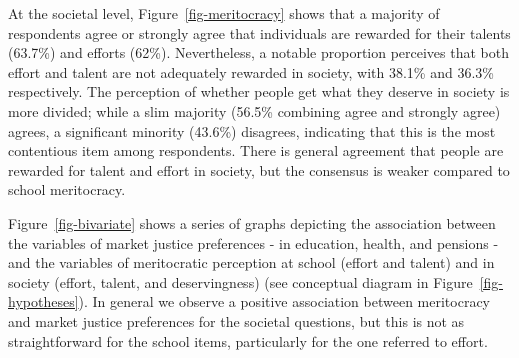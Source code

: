 \documentclass[
    behavsci,
    article,
    submit,
moreauthors
]{mdpi}
\begin{document}
At the societal level, Figure~\ref{fig-meritocracy} shows that a
majority of respondents agree or strongly agree that individuals are
rewarded for their talents (63.7\%) and efforts (62\%). Nevertheless, a
notable proportion perceives that both effort and talent are not
adequately rewarded in society, with 38.1\% and 36.3\% respectively. The
perception of whether people get what they deserve in society is more
divided; while a slim majority (56.5\% combining agree and strongly
agree) agrees, a significant minority (43.6\%) disagrees, indicating
that this is the most contentious item among respondents. There is
general agreement that people are rewarded for talent and effort in
society, but the consensus is weaker compared to school meritocracy.

Figure~\ref{fig-bivariate} shows a series of graphs depicting the
association between the variables of market justice preferences - in
education, health, and pensions - and the variables of meritocratic
perception at school (effort and talent) and in society (effort, talent,
and deservingness) (see conceptual diagram in
Figure~\ref{fig-hypotheses}). In general we observe a positive
association between meritocracy and market justice preferences for the
societal questions, but this is not as straightforward for the school
items, particularly for the one referred to effort.
\end{document}

